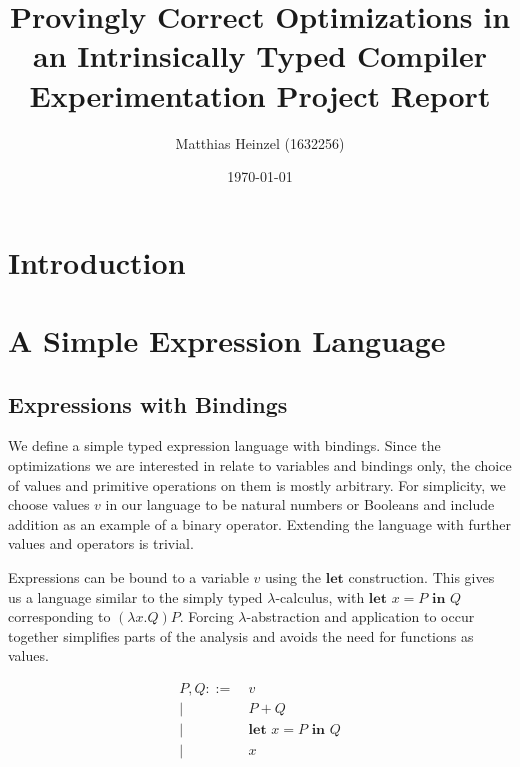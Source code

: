 \documentclass[11pt,a4paper]{article}
\title{Provingly Correct Optimizations in an Intrinsically Typed Compiler\\
  \vspace{1cm}
  \large Experimentation Project Report}
\author{Matthias Heinzel (1632256)}
\date{\today}
\begin{document}
\maketitle
\tableofcontents


\section{Introduction}

\section{A Simple Expression Language}

\subsection{Expressions with Bindings}

We define a simple typed expression language with bindings.
Since the optimizations we are interested in relate to variables and bindings only,
the choice of values and primitive operations on them is mostly arbitrary.
For simplicity, we choose values $v$ in our language to be natural numbers or Booleans
and include addition as an example of a binary operator.
Extending the language with further values and operators is trivial.

Expressions can be bound to a variable $v$ using the $\textbf{let}$ construction.
This gives us a language similar to the simply typed $\lambda$-calculus,
with $\textbf{let } x = P \textbf{ in } Q$ corresponding to $(\lambda x. Q) P$.
Forcing $\lambda$-abstraction and application to occur together
simplifies parts of the analysis and
avoids the need for functions as values.

\begin{align*}
  P, Q ::=&\ v
  \\ \big|&\ P + Q
  \\ \big|&\ \textbf{let } x = P \textbf{ in } Q
  \\ \big|&\ x
\end{align*}

\end{document}
